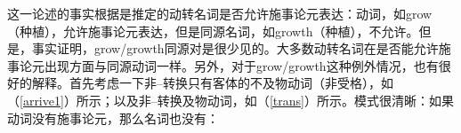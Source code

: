 这一论述的事实根据是推定的动转名词是否允许施事论元表达：动词，如grow（种植），允许施事论元表达，但是同源名词，如growth（种植），不允许。但是，事实证明，grow/growth同源对是很少见的。大多数动转名词在是否能允许施事论元出现方面与同源动词一样。另外，对于grow/growth这种例外情况，也有很好的解释\citep{Wechsler2008a}。首先考虑一下非--转换只有客体的不及物动词（非受格），如（\ref{arrive1}）所示；以及非--转换及物动词，如（\ref{trans}）所示。模式很清晰：如果动词没有施事论元，那么名词也没有：

